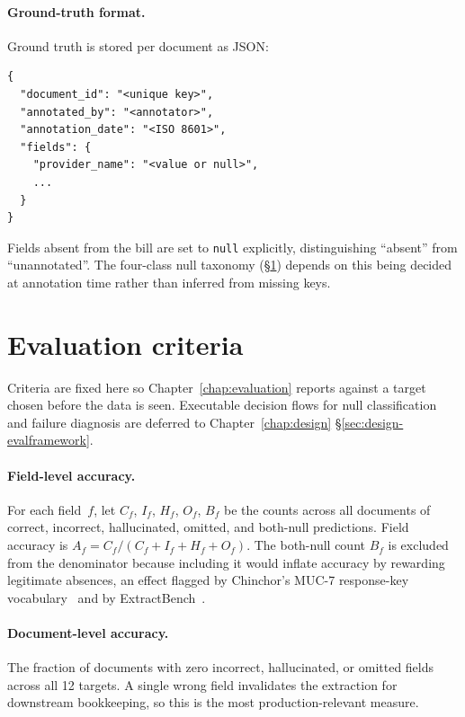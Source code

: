 \paragraph{Ground-truth format.} Ground truth is stored per document
as JSON:

\begin{verbatim}
{
  "document_id": "<unique key>",
  "annotated_by": "<annotator>",
  "annotation_date": "<ISO 8601>",
  "fields": {
    "provider_name": "<value or null>",
    ...
  }
}
\end{verbatim}

Fields absent from the bill are set to \texttt{null} explicitly,
distinguishing ``absent'' from ``unannotated''. The four-class null
taxonomy (\S\ref{sec:spec-evaluation}) depends on this being decided
at annotation time rather than inferred from missing keys.

\section{Evaluation criteria}
\label{sec:spec-evaluation}

Criteria are fixed here so Chapter~\ref{chap:evaluation} reports
against a target chosen before the data is seen. Executable decision
flows for null classification and failure diagnosis are deferred to
Chapter~\ref{chap:design} \S\ref{sec:design-evalframework}.

\paragraph{Field-level accuracy.} For each field~$f$, let $C_f$,
$I_f$, $H_f$, $O_f$, $B_f$ be the counts across all documents of
correct, incorrect, hallucinated, omitted, and both-null predictions.
Field accuracy is
\(A_f = C_f / (C_f + I_f + H_f + O_f)\). The both-null count $B_f$ is
excluded from the denominator because including it would inflate
accuracy by rewarding legitimate absences, an effect flagged by
Chinchor's MUC-7 response-key vocabulary~\cite{chinchor1998muc7}
and by ExtractBench~\cite{ferguson2026extractbench}.

\paragraph{Document-level accuracy.} The fraction of documents with
zero incorrect, hallucinated, or omitted fields across all 12
targets. A single wrong field invalidates the extraction for
downstream bookkeeping, so this is the most production-relevant
measure.

